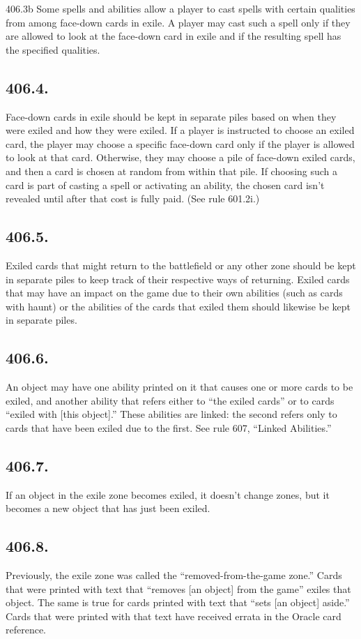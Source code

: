 406.3b Some spells and abilities allow a player to cast spells with certain qualities from among face-down cards in exile. A player may cast such a spell only if they are allowed to look at the face-down card in exile and if the resulting spell has the specified qualities.

\subsection*{406.4.}
Face-down cards in exile should be kept in separate piles based on when they were exiled and how they were exiled. If a player is instructed to choose an exiled card, the player may choose a specific face-down card only if the player is allowed to look at that card. Otherwise, they may choose a pile of face-down exiled cards, and then a card is chosen at random from within that pile. If choosing such a card is part of casting a spell or activating an ability, the chosen card isn’t revealed until after that cost is fully paid. (See rule 601.2i.)

\subsection*{406.5.}
Exiled cards that might return to the battlefield or any other zone should be kept in separate piles to keep track of their respective ways of returning. Exiled cards that may have an impact on the game due to their own abilities (such as cards with haunt) or the abilities of the cards that exiled them should likewise be kept in separate piles.

\subsection*{406.6.}
An object may have one ability printed on it that causes one or more cards to be exiled, and another ability that refers either to “the exiled cards” or to cards “exiled with [this object].” These abilities are linked: the second refers only to cards that have been exiled due to the first. See rule 607, “Linked Abilities.”

\subsection*{406.7.}
If an object in the exile zone becomes exiled, it doesn’t change zones, but it becomes a new object that has just been exiled.

\subsection*{406.8.}
Previously, the exile zone was called the “removed-from-the-game zone.” Cards that were printed with text that “removes [an object] from the game” exiles that object. The same is true for cards printed with text that “sets [an object] aside.” Cards that were printed with that text have received errata in the Oracle card reference.

